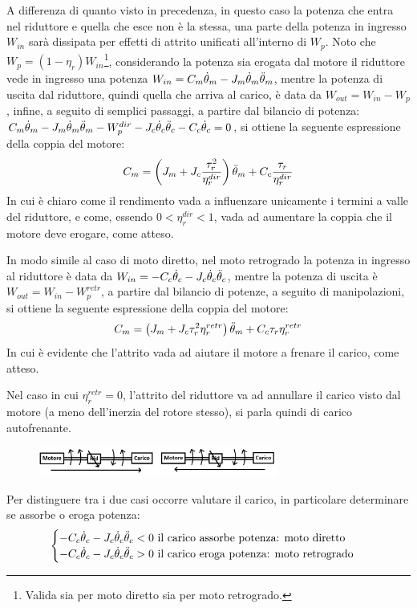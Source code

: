 A differenza di quanto visto in precedenza, in questo caso la potenza che entra nel riduttore e quella che esce non è la stessa, una parte della potenza in ingresso $W_{in}$ sarà dissipata per effetti di attrito unificati all'interno di $W_p$. 
Noto che $W_p=(1-\eta_r) W_{in}$\footnote{Valida sia per moto diretto sia per moto retrogrado.}, considerando la potenza sia erogata dal motore il riduttore vede in ingresso una potenza $W_{in}=C_m \dot{\theta}_m - J_m \dot{\theta}_m \Ddot{\theta}_m$, mentre la potenza di uscita dal riduttore, quindi quella che arriva al carico, è data da $W_{out}=W_{in}-W_p$, infine, a seguito di semplici passaggi, a partire dal bilancio di potenza: $C_m \dot{\theta}_m - J_m \dot{\theta}_m \Ddot{\theta}_m - W_p^{dir} - J_c \dot{\theta}_c \Ddot{\theta}_c - C_c \dot{\theta}_c = 0$, si ottiene la seguente espressione della coppia del motore:
\[ C_m = \left(J_m+J_c\frac{\tau^2_r}{\eta_r^{dir}}\right) \Ddot{\theta}_m + C_c\frac{\tau_r}{\eta_r^{dir}} \]
In cui è chiaro come il rendimento vada a influenzare unicamente i termini a valle del riduttore, e come, essendo $0<\eta_r^{dir}<1$, vada ad aumentare la coppia che il motore deve erogare, come atteso.

In modo simile al caso di moto diretto, nel moto retrogrado la potenza in ingresso al riduttore è data da $W_{in}=-C_c\dot{\theta}_c - J_c \dot{\theta}_c \Ddot{\theta}_c$, mentre la potenza di uscita è $W_{out}=W_{in}-W_p^{retr}$, a partire dal bilancio di potenze, a seguito di manipolazioni, si ottiene la seguente espressione della coppia del motore:
\[ C_m = \left(J_m + J_c \tau_r^2\eta_r^{retr} \right)\Ddot{\theta}_m + C_c\tau_r \eta_r^{retr} \]
In cui è evidente che l'attrito vada ad aiutare il motore a frenare il carico, come atteso.

Nel caso in cui $\eta_r^{retr}=0$, l'attrito del riduttore va ad annullare il carico visto dal motore (a meno dell'inerzia del rotore stesso), si parla quindi di carico autofrenante.

\begin{figure}[h]
    \centering
    \includegraphics[width=0.7\textwidth]{Immagini/mrc_moti_diretti_vs_retrogrado.png}
\end{figure}

Per distinguere tra i due casi occorre valutare il carico, in particolare determinare se assorbe o eroga potenza:
\[
\begin{cases}
    -C_c\dot{\theta}_c - J_c \dot{\theta}_c \Ddot{\theta}_c < 0 \text{ il carico assorbe potenza: moto diretto} \\
    -C_c\dot{\theta}_c - J_c \dot{\theta}_c \Ddot{\theta}_c > 0 \text{ il carico eroga potenza: moto retrogrado}
\end{cases}
\]

